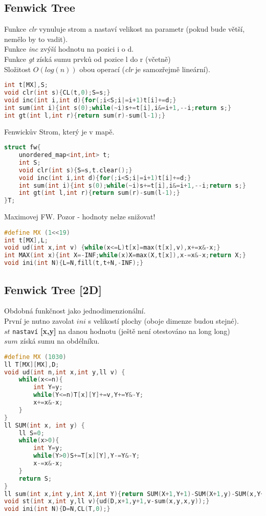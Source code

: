 \documentclass[11pt]{article}
\begin{document}
\subsection{Fenwick Tree}
Funkce \textit{clr} vynuluje strom a nastaví velikost na parametr (pokud bude větší, nemělo by to vadit).
\\Funkce \textit{inc} zvýší hodnotu na pozici \textsf{i} o \textsf{d}.
\\Funkce \textit{gt} získá sumu prvků od pozice \textsf{l} do \textsf{r} (včetně)
\\Složitost $O(log(n))$ obou operací (\textit{clr} je samozřejmě lineární).
\begin{lstlisting}[language=C++]
int t[MX],S;
void clr(int s){CL(t,0);S=s;}
void inc(int i,int d){for(;i<S;i|=i+1)t[i]+=d;}
int sum(int i){int s(0);while(~i)s+=t[i],i&=i+1,--i;return s;}
int gt(int l,int r){return sum(r)-sum(l-1);}
\end{lstlisting}
Fenwickův Strom, který je v mapě.
\begin{lstlisting}[language=C++]
struct fw{
    unordered_map<int,int> t;
    int S;
    void clr(int s){S=s,t.clear();}
    void inc(int i,int d){for(;i<S;i|=i+1)t[i]+=d;}
    int sum(int i){int s(0);while(~i)s+=t[i],i&=i+1,--i;return s;}
    int gt(int l,int r){return sum(r)-sum(l-1);}
}T;
\end{lstlisting}
Maximovej FW. Pozor - hodnoty nelze snižovat!
\begin{lstlisting}[language=C++]
#define MX (1<<19)
int t[MX],L;
void ud(int x,int v) {while(x<=L)t[x]=max(t[x],v),x+=x&-x;}
int MAX(int x){int X=-INF;while(x)X=max(X,t[x]),x-=x&-x;return X;}
void ini(int N){L=N,fill(t,t+N,-INF);}
\end{lstlisting}
\subsection{Fenwick Tree [2D]}
Obdobná funkčnost jako jednodimenzionální.
\\První je nutno zavolat $ini$ s velikostí plochy (oboje dimenze budou stejné).
\\$st$ \texttt{nastaví} \textbf{[x,y]} na danou hodnotu (ještě není otestováno na long long)
\\$sum$ získá sumu na obdélníku.
\begin{lstlisting}[language=C++]
#define MX (1030)
ll T[MX][MX],D;
void ud(int n,int x,int y,ll v) {
    while(x<=n){
        int Y=y;
        while(Y<=n)T[x][Y]+=v,Y+=Y&-Y;
        x+=x&-x;
    }
}
ll SUM(int x, int y) {
    ll S=0;
    while(x>0){
        int Y=y;
        while(Y>0)S+=T[x][Y],Y-=Y&-Y;	
        x-=x&-x;
    }
    return S;
}
ll sum(int x,int y,int X,int Y){return SUM(X+1,Y+1)-SUM(X+1,y)-SUM(x,Y+1)+SUM(x,y);}
void st(int x,int y,ll v){ud(D,x+1,y+1,v-sum(x,y,x,y));}
void ini(int N){D=N,CL(T,0);}
\end{lstlisting}
\end{document}
